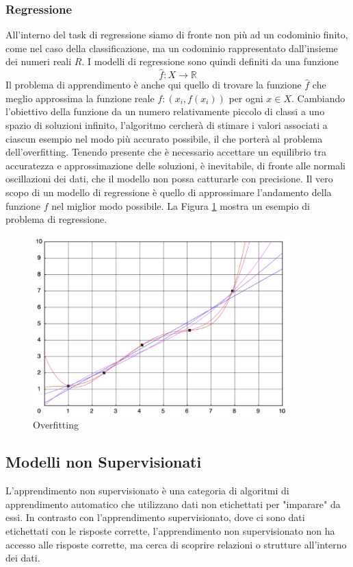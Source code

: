 \subsubsection{Regressione}
All'interno del task di regressione siamo di fronte non più ad un codominio finito, come nel caso della classificazione, ma un codominio rappresentato dall'insieme dei numeri reali \(R\). I modelli di regressione sono quindi definiti da una funzione
\[\hat{f}: X \rightarrow \mathbb{R}\]
Il problema di apprendimento è anche qui quello di trovare la funzione \(\hat{f}\) che meglio approssima la funzione reale \(f: (x_i, f(x_i))\) per ogni \(x\in X\).
Cambiando l'obiettivo della funzione da un numero relativamente piccolo di classi a uno spazio di soluzioni infinito, l'algoritmo cercherà di stimare i valori associati a ciascun esempio nel modo più accurato possibile, il che porterà al problema dell'overfitting. Tenendo presente che è necessario accettare un equilibrio tra accuratezza e approssimazione delle soluzioni, è inevitabile, di fronte alle normali oscillazioni dei dati, che il modello non possa catturarle con precisione. Il vero scopo di un modello di regressione è quello di approssimare l'andamento della funzione $f$ nel miglior modo possibile. La Figura \ref{overfitting} mostra un esempio di problema di regressione.

\begin{figure}[t]
	\centering
	\includegraphics[width=10cm, scale=1]{images/overfitting}
	\caption{Overfitting}
	\label{overfitting}
\end{figure}


\subsection{Modelli non Supervisionati}
L'apprendimento non supervisionato è una categoria di algoritmi di apprendimento automatico che utilizzano dati non etichettati per "imparare" da essi. In contrasto con l'apprendimento supervisionato, dove ci sono dati etichettati con le risposte corrette, l'apprendimento non supervisionato non ha accesso alle risposte corrette, ma cerca di scoprire relazioni o strutture all'interno dei dati.

